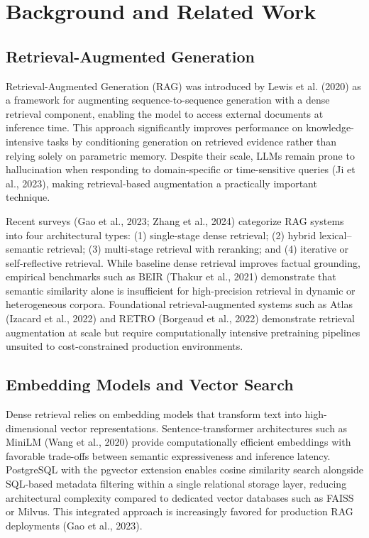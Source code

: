 \chapter{Background and Related Work}

\section{Retrieval-Augmented Generation}
\label{sec:lit_rag}

Retrieval-Augmented Generation (RAG) was introduced by Lewis et al. (2020) as a framework for augmenting sequence-to-sequence generation with a dense retrieval component, enabling the model to access external documents at inference time. This approach significantly improves performance on knowledge-intensive tasks by conditioning generation on retrieved evidence rather than relying solely on parametric memory. Despite their scale, LLMs remain prone to hallucination when responding to domain-specific or time-sensitive queries (Ji et al., 2023), making retrieval-based augmentation a practically important technique.

Recent surveys (Gao et al., 2023; Zhang et al., 2024) categorize RAG systems into four architectural types: (1) single-stage dense retrieval; (2) hybrid lexical--semantic retrieval; (3) multi-stage retrieval with reranking; and (4) iterative or self-reflective retrieval. While baseline dense retrieval improves factual grounding, empirical benchmarks such as BEIR (Thakur et al., 2021) demonstrate that semantic similarity alone is insufficient for high-precision retrieval in dynamic or heterogeneous corpora. Foundational retrieval-augmented systems such as Atlas (Izacard et al., 2022) and RETRO (Borgeaud et al., 2022) demonstrate retrieval augmentation at scale but require computationally intensive pretraining pipelines unsuited to cost-constrained production environments.

\section{Embedding Models and Vector Search}
\label{sec:lit_embed}

Dense retrieval relies on embedding models that transform text into high-dimensional vector representations. Sentence-transformer architectures such as MiniLM (Wang et al., 2020) provide computationally efficient embeddings with favorable trade-offs between semantic expressiveness and inference latency. PostgreSQL with the pgvector extension enables cosine similarity search alongside SQL-based metadata filtering within a single relational storage layer, reducing architectural complexity compared to dedicated vector databases such as FAISS or Milvus. This integrated approach is increasingly favored for production RAG deployments (Gao et al., 2023).

